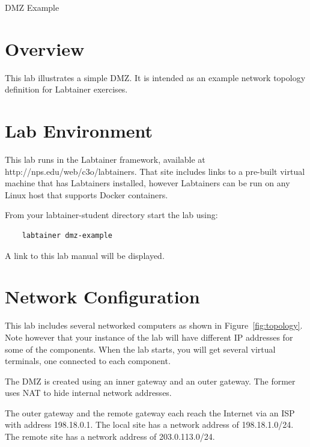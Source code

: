 


\begin{center}
{\LARGE DMZ Example}
\vspace{0.1in}\\
\end{center}

\copyrightnotice

\section{Overview}
This lab illustrates a simple DMZ.
It is intended as an example network topology definition for
Labtainer exercises.

\section{Lab Environment}
This lab runs in the Labtainer framework,
available at http://nps.edu/web/c3o/labtainers.
That site includes links to a pre-built virtual machine
that has Labtainers installed, however Labtainers can
be run on any Linux host that supports Docker containers.

From your labtainer-student directory start the lab using:
\begin{verbatim}
    labtainer dmz-example
\end{verbatim}
\noindent A link to this lab manual will be displayed.  

\section{Network Configuration}
This lab includes several networked computers as shown in Figure~\ref{fig:topology}.
Note however that your instance of the lab will have different IP addresses
for some of the components.
When the lab starts, you will get several virtual terminals, one connected to each
component.

The DMZ is created using an inner gateway and an outer gateway.  The former uses NAT to
hide internal network addresses.

The outer gateway and the remote gateway each reach the Internet via an ISP with 
address 198.18.0.1.  The local site has a network address of 198.18.1.0/24.  The remote
site has a network address of 203.0.113.0/24.

